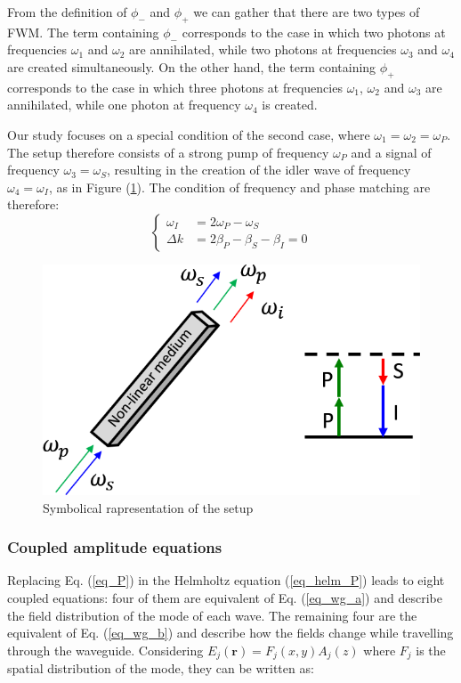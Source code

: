 \documentclass[12pt,a4paper,twoside]{article}
\begin{document}
From the definition of $\phi_-$ and $\phi_+$ we can gather that there are two types of FWM.
The term containing $\phi_-$ corresponds to the case in which two photons at frequencies $\omega_1$ and $\omega_2$ are annihilated, while two photons at frequencies $\omega_3$ and $\omega_4$ are created simultaneously.
On the other hand, the term containing $\phi_+$ corresponds to the case in which three photons at frequencies $\omega_1$, $\omega_2$ and $\omega_3$ are annihilated, while one photon at frequency $\omega_4$ is created.

Our study focuses on a special condition of the second case, where $\omega_1 = \omega_2 = \omega_P$. The setup therefore consists of a strong pump of frequency  $\omega_P$ and a signal of frequency  $\omega_3 = \omega_S$, resulting in the creation of the idler wave of frequency $\omega_4 = \omega_I$, as in Figure (\ref{fig_setup}).
The condition of frequency and phase matching are therefore:
\begin{equation}
\left\{
 	\begin{aligned}
		\omega_I &= 2\omega_P - \omega_S \\
		\Delta k &= 2\beta_P - \beta_S - \beta_I = 0
	\end{aligned}
\right.
\label{eq_f&pmc}
\end{equation} %

\begin{figure}[ht]
	\centering
	\includegraphics[width=.55\textwidth]{setup.png}
	\caption{Symbolical rapresentation of the setup}
	\label{fig_setup}
\end{figure}


\subsubsection{Coupled amplitude equations}

Replacing Eq. (\ref{eq_P}) in the Helmholtz equation (\ref{eq_helm_P}) leads to eight coupled equations: four of them are equivalent of Eq. (\ref{eq_wg_a}) and describe the field distribution of the mode of each wave.
The remaining four are the equivalent of Eq. (\ref{eq_wg_b}) and describe how the fields change while travelling through the waveguide.
Considering $E_j(\textbf{r}) = F_j(x,y)A_j(z)$ where $F_j$ is the spatial distribution of the mode, they can be written as:
\end{document}
